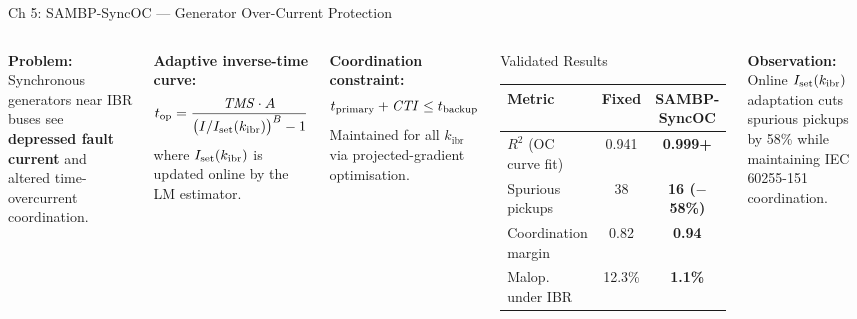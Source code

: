 \documentclass[10pt,aspectratio=169]{beamer}
\newcommand{\obs}[1]{%
  {\color{iitmred}\textbf{Observation:} #1}%
}
\newcommand{\kibr}{k_{\mathrm{ibr}}}
\newcommand{\TMS}{\mathit{TMS}}
\newcommand{\CTI}{\mathit{CTI}}
\begin{document}
\begin{frame}{Ch 5: SAMBP-SyncOC — Generator Over-Current Protection}
  \begin{columns}[T]
      \textbf{Problem:} Synchronous generators near IBR buses
      see \textbf{depressed fault current} and altered time-overcurrent
      coordination.

      \medskip
      \textbf{Adaptive inverse-time curve:}
      \[
        t_{\rm op} =
          \frac{\TMS \cdot A}
               {\bigl(I/I_{\rm set}(\kibr)\bigr)^B - 1}
      \]
      where $I_{\rm set}(\kibr)$ is updated online by the LM estimator.

      \medskip
      \textbf{Coordination constraint:}
      \[
        t_{\rm primary} + \CTI \leq t_{\rm backup}
      \]
      Maintained for all $\kibr$ via projected-gradient optimisation.

      \begin{block}{\small Validated Results}
        \small
        \begin{tabular}{lcc}
          \toprule
          Metric & Fixed & SAMBP-SyncOC \\
          \midrule
          $R^2$ (OC curve fit) & 0.941 & \textbf{0.999+}\\
          Spurious pickups & 38 & \textbf{16 ($-$58\%)}\\
          Coordination margin & 0.82 & \textbf{0.94}\\
          Malop. under IBR & 12.3\% & \textbf{1.1\%}\\
          \bottomrule
        \end{tabular}
      \end{block}
      \vspace{0.3cm}
      \obs{Online $I_{\rm set}(\kibr)$ adaptation cuts
        spurious pickups by 58\% while maintaining
        IEC 60255-151 coordination.}
  \end{columns}
\end{frame}
\end{document}
